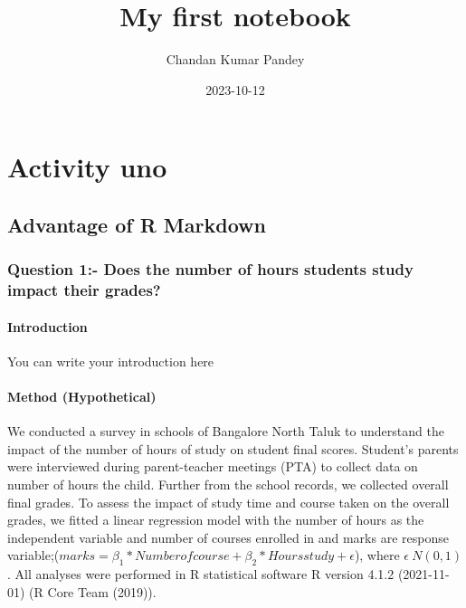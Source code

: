 \documentclass[
]{article}
\title{My first notebook}
\author{Chandan Kumar Pandey}
\date{2023-10-12}
\begin{document}
\maketitle

\hypertarget{activity-uno}{%
\section{Activity uno}\label{activity-uno}}

\hypertarget{advantage-of-r-markdown}{%
\subsection{Advantage of R Markdown}\label{advantage-of-r-markdown}}

\hypertarget{question-1--does-the-number-of-hours-students-study-impact-their-grades}{%
\subsubsection{Question 1:- Does the number of hours students study
impact their
grades?}\label{question-1--does-the-number-of-hours-students-study-impact-their-grades}}

\hypertarget{introduction}{%
\paragraph{Introduction}\label{introduction}}

You can write your introduction here

\hypertarget{method-hypothetical}{%
\paragraph{Method (Hypothetical)}\label{method-hypothetical}}

We conducted a survey in schools of Bangalore North Taluk to understand
the impact of the number of hours of study on student final scores.
Student's parents were interviewed during parent-teacher meetings (PTA)
to collect data on number of hours the child. Further from the school
records, we collected overall final grades. To assess the impact of
study time and course taken on the overall grades, we fitted a linear
regression model with the number of hours as the independent variable
and number of courses enrolled in and marks are response
variable;(\(marks=\beta_1*Number of course +\beta_2 * Hours study + \epsilon\)),
where \(\epsilon~N(0,1)\) . All analyses were performed in R statistical
software R version 4.1.2 (2021-11-01) (R Core Team (2019)).
\end{document}
